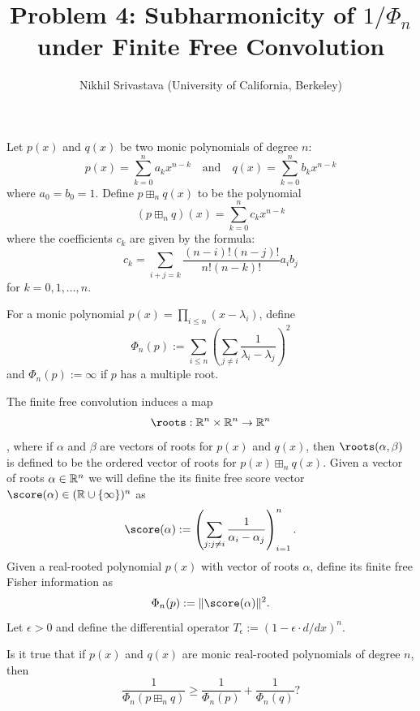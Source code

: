 

\title{Problem 4: Subharmonicity of $1/\Phi_n$ under Finite Free Convolution}
\author{Nikhil Srivastava (University of California, Berkeley)}
\date{}


\maketitle

Let $p(x)$ and $q(x)$ be two monic polynomials of degree $n$:
\[
p(x) = \sum_{k=0}^n a_k x^{n-k} \quad \text{and} \quad q(x) = \sum_{k=0}^n b_k x^{n-k}
\]
where $a_0 = b_0 = 1$. Define $p \boxplus_n q(x)$ to be the polynomial
\[
(p \boxplus_n q)(x) = \sum_{k=0}^n c_k x^{n-k}
\]
where the coefficients $c_k$ are given by the formula:
\[
c_k = \sum_{i+j=k} \frac{(n-i)! (n-j)!}{n! (n-k)!} a_i b_j
\]
for $k = 0, 1, \dots, n$.

For a monic polynomial $p(x)=\prod_{i\le n}(x- \lambda_i)$, define
$$\Phi_n(p):=\sum_{i\le n}\left(\sum_{j\neq i} \frac{1}{\lambda_i-\lambda_j}\right)^2$$
and $\Phi_n(p):=\infty$ if $p$ has a multiple root.

The finite free convolution induces a map $$\roots: \bR^{n}\times \bR^n \to \bR^n$$, where if $\alpha$ and $\beta$ are vectors of roots for $p(x)$ and $q(x)$, then $\roots(\alpha, \beta)$ is defined to be the ordered vector of roots for $p(x)\boxplus_n q(x)$.
Given a vector of roots $\alpha\in \mathbb{R}^n$ we will define the its finite free score vector $\score(\alpha) \in (\bR\cup\{\infty\})^n$ as
$$\score(\alpha) := \left( \sum_{j : j \neq i} \frac{1}{\alpha_i-\alpha_j} \right)_{i=1}^n. $$ Given a real-rooted polynomial $p(x)$ with vector of roots $\alpha$, define its finite free Fisher information as
$$\Phi_n(p) := \|\score(\alpha)\|^2.$$  Let $\epsilon>0$ and define the differential operator $T_\epsilon:=(1-\epsilon \cdot d/dx)^n$.

Is it true that if $p(x)$ and $q(x)$ are monic real-rooted polynomials of degree $n$, then
$$\frac{1}{\Phi_n(p\boxplus_n q)} \ge \frac{1}{\Phi_n(p)}+\frac{1}{\Phi_n(q)}?$$


